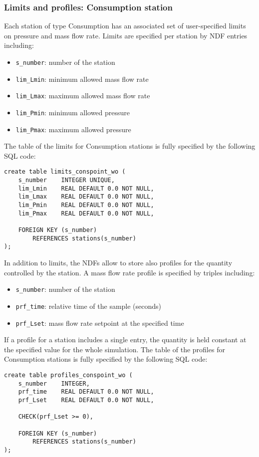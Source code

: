 \documentclass[10pt]{article}
\begin{document}
\subsubsection{Limits and profiles: Consumption station}

Each station of type Consumption has an associated set of user-specified limits
on pressure and mass flow rate. Limits are specified per station by NDF entries
including:
\begin{itemize}
    \item \texttt{s\_number}:   number of the station
    \item \texttt{lim\_Lmin}:   minimum allowed mass flow rate
    \item \texttt{lim\_Lmax}:   maximum allowed mass flow rate
    \item \texttt{lim\_Pmin}:   minimum allowed pressure
    \item \texttt{lim\_Pmax}:   maximum allowed pressure
\end{itemize}
The table of the limits for Consumption stations is fully specified by the following SQL code:
\begin{verbatim}
create table limits_conspoint_wo (
    s_number    INTEGER UNIQUE,
    lim_Lmin    REAL DEFAULT 0.0 NOT NULL,
    lim_Lmax    REAL DEFAULT 0.0 NOT NULL,
    lim_Pmin    REAL DEFAULT 0.0 NOT NULL,
    lim_Pmax    REAL DEFAULT 0.0 NOT NULL,

    FOREIGN KEY (s_number)
        REFERENCES stations(s_number)
);
\end{verbatim}
In addition to limits, the NDFs allow to store also profiles for the quantity
controlled by the station. A mass flow rate profile is specified by triples including:
\begin{itemize}
    \item \texttt{s\_number}:   number of the station
    \item \texttt{prf\_time}:   relative time of the sample (seconds)
    \item \texttt{prf\_Lset}:   mass flow rate setpoint at the specified time
\end{itemize}
If a profile for a station includes a single entry, the quantity is held constant
at the specified value for the whole simulation. The table of the profiles for
Consumption stations is fully specified by the following SQL code:
\begin{verbatim}
create table profiles_conspoint_wo (
    s_number    INTEGER,
    prf_time    REAL DEFAULT 0.0 NOT NULL,
    prf_Lset    REAL DEFAULT 0.0 NOT NULL,

    CHECK(prf_Lset >= 0),

    FOREIGN KEY (s_number)
        REFERENCES stations(s_number)
);
\end{verbatim}
\end{document}
